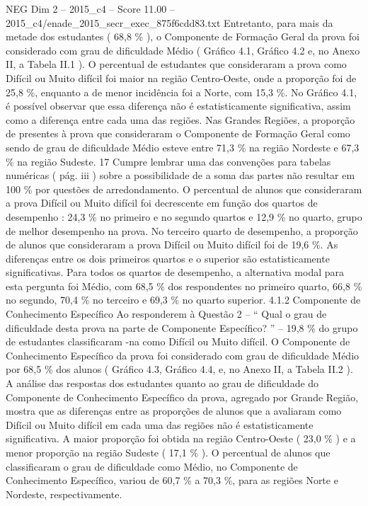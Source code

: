 \begin{textsample}{NEG Dim 2 – 2015\_c4 – Score 11.00 – 2015\_c4/enade\_2015\_secr\_exec\_875f6cdd83.txt}
Entretanto, para mais da metade dos estudantes ( 68,8 \% ), o Componente de Formação Geral da prova foi considerado com grau de dificuldade Médio ( Gráfico 4.1, Gráfico 4.2 e, no Anexo II, a Tabela II.1 ).
O percentual de estudantes que consideraram a prova como Difícil ou Muito difícil foi maior na região Centro-Oeste, onde a proporção foi de 25,8 \%, enquanto a de menor incidência foi a Norte, com 15,3 \%.
No Gráfico 4.1, é possível observar que essa diferença não é estatisticamente significativa, assim como a diferença entre cada uma das regiões.
Nas Grandes Regiões, a proporção de presentes à prova que consideraram o Componente de Formação Geral como sendo de grau de dificuldade Médio esteve entre 71,3 \% na região Nordeste e 67,3 \% na região Sudeste. 17 Cumpre lembrar uma das convenções para tabelas numéricas ( pág. iii ) sobre a possibilidade de a soma das partes não resultar em 100 \% por questões de arredondamento.
O percentual de alunos que consideraram a prova Difícil ou Muito difícil foi decrescente em função dos quartos de desempenho : 24,3 \% no primeiro e no segundo quartos e 12,9 \% no quarto, grupo de melhor desempenho na prova.
No terceiro quarto de desempenho, a proporção de alunos que consideraram a prova Difícil ou Muito difícil foi de 19,6 \%.
As diferenças entre os dois primeiros quartos e o superior são estatisticamente significativas.
Para todos os quartos de desempenho, a alternativa modal para esta pergunta foi Médio, com 68,5 \% dos respondentes no primeiro quarto, 66,8 \% no segundo, 70,4 \% no terceiro e 69,3 \% no quarto superior. 4.1.2 Componente de Conhecimento Específico Ao responderem à Questão 2 – “ Qual o grau de dificuldade desta prova na parte de Componente Específico? ” – 19,8 \% do grupo de estudantes classificaram -na como Difícil ou Muito difícil.
O Componente de Conhecimento Específico da prova foi considerado com grau de dificuldade Médio por 68,5 \% dos alunos ( Gráfico 4.3, Gráfico 4.4, e, no Anexo II, a Tabela II.2 ).
A análise das respostas dos estudantes quanto ao grau de dificuldade do Componente de Conhecimento Específico da prova, agregado por Grande Região, mostra que as diferenças entre as proporções de alunos que a avaliaram como Difícil ou Muito difícil em cada uma das regiões não é estatisticamente significativa.
A maior proporção foi obtida na região Centro-Oeste ( 23,0 \% ) e a menor proporção na região Sudeste ( 17,1 \% ).
O percentual de alunos que classificaram o grau de dificuldade como Médio, no Componente de Conhecimento Específico, variou de 60,7 \% a 70,3 \%, para as regiões Norte e Nordeste, respectivamente.

\end{textsample}
